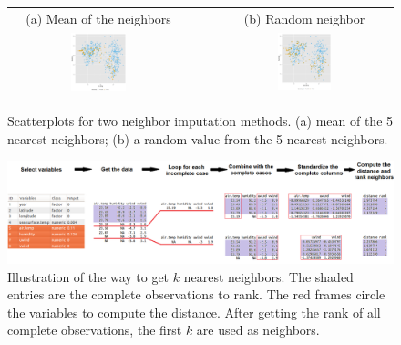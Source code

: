 \documentclass[article]{jss}
\begin{document}
\begin{center}
\begin{figure}[h]
\begin{centering}
\begin{tabular}{cccc}
{\tiny{(a) Mean of the neighbors}} &  &  & {\tiny{(b) Random neighbor}}\tabularnewline
\includegraphics[width=0.32\textwidth]{graph/fig3-5-knn} &  &  & \includegraphics[width=0.32\textwidth]{graph/fig3-5-knn-2}\tabularnewline
\end{tabular}
\par\end{centering}
\caption{Scatterplots for two neighbor imputation methods. (a) mean of the 5 nearest neighbors; (b) a random value from the 5 nearest neighbors.}
\label{fig:neighbor-imputation}
\end{figure}
\par\end{center}


\begin{center}
\begin{figure}[h]
\begin{centering}
\includegraphics[width=1\textwidth]{graph/fig9-diagram}
\par\end{centering}
\caption{Illustration of the way to get $k$ nearest neighbors. The shaded entries are the complete observations to rank. The red frames circle the variables to compute the distance. After getting the rank of all complete observations, the first $k$ are used as neighbors. }
\label{fig:neighbor-diagram}
\end{figure}
\par\end{center}
\end{document}
